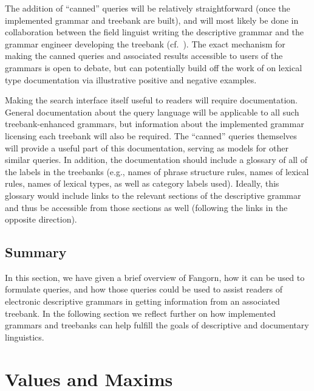 The addition of ``canned'' queries will be relatively straightforward
(once the implemented grammar and treebank are built), and will most
likely be done in collaboration between the field linguist writing the
descriptive grammar and the grammar engineer developing the treebank
(cf.\ ). The exact mechanism for making the canned queries
and associated results accessible to users of the grammars is open to
debate, but can potentially build off the work of
 on lexical type documentation via
illustrative positive and negative examples.

Making the search interface itself useful to readers will require
documentation.  General documentation about the query language will be
applicable to all such treebank-enhanced grammars, but information about
the implemented grammar licensing each treebank will also be required.
The ``canned'' queries themselves will provide a useful part of this
documentation, serving as models for other similar queries.  In
addition, the documentation should include a glossary of all of the
labels in the treebanks (e.g., names of phrase structure rules, names of
lexical rules, names of lexical types, as well as category labels used).
Ideally, this glossary would include links to the relevant sections of
the descriptive grammar and thus be accessible from those sections as
well (following the links in the opposite direction).

\subsection{Summary}

In this section, we have given a brief overview of Fangorn,
how it can be used to formulate queries, and how those queries
could be used to assist readers of electronic descriptive grammars
in getting information from an associated treebank.  In the following
section we reflect further on how implemented grammars and 
treebanks can help fulfill the goals of descriptive and documentary
linguistics.

\section{Values and Maxims}
\label{sec:vm}

